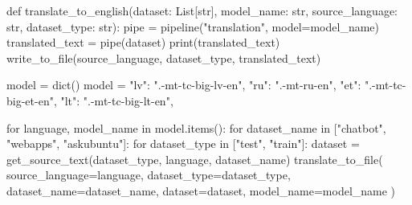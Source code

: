 \begin{python}
def translate_to_english(dataset: List[str], model_name: str, source_language: str, dataset_type: str):
    pipe = pipeline("translation", model=model_name)
    translated_text = pipe(dataset)
    print(translated_text)
    write_to_file(source_language, dataset_type, translated_text)


model = dict()
model = {
    "lv": ".\opus-mt-tc-big-lv-en",
    "ru": ".\opus-mt-ru-en",
    "et": ".\opus-mt-tc-big-et-en",
    "lt": ".\opus-mt-tc-big-lt-en",
}

for language, model_name in model.items():
    for dataset_name in ["chatbot", "webapps", "askubuntu"]:
        for dataset_type in ["test", "train"]:
            dataset = get_source_text(dataset_type, language, dataset_name)
            translate_to_file(
                source_language=language, dataset_type=dataset_type, dataset_name=dataset_name, dataset=dataset,
                model_name=model_name
            )

\end{python}